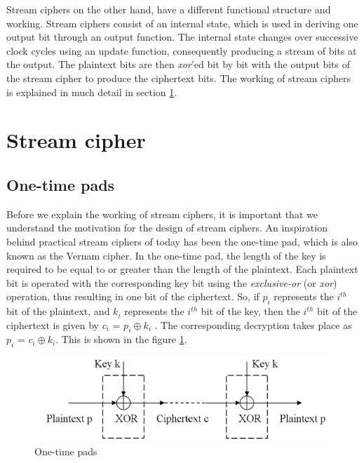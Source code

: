 Stream ciphers on the other hand, have a different functional structure and working. Stream ciphers consist of an internal state, which is used in deriving one output bit through an output function. The internal state changes over successive clock cycles using an update function, consequently producing a stream of bits at the output. The plaintext bits are then \emph{xor}'ed bit by bit with the output bits of the stream cipher to produce the ciphertext bits. The working of stream ciphers is explained in much detail in section \ref{sec:stream-cipher}. 

\section{Stream cipher}
\label{sec:stream-cipher}

\subsection{One-time pads} 
\label{sec:one-time-pads}

Before we explain the working of stream ciphers, it is important that we understand the motivation for the design of stream ciphers. An inspiration behind practical stream ciphers of today has been the one-time pad, which is also known as the Vernam cipher. In the one-time pad, the length of the key is required to be equal to or greater than the length of the plaintext. Each plaintext bit is operated with the corresponding key bit using the \emph{exclusive-or} (or \emph{xor}) operation, thus resulting in one bit of the ciphertext. So, if $p_i$ represents the $i^{th}$ bit of the plaintext, and $k_i$ represents the $i^{th}$ bit of the key, then the $i^{th}$ bit of the ciphertext is given by $c_i$ = $p_i \oplus k_i$ \cite{stamp2007acb}. The corresponding decryption takes place as $p_i$ = $c_i \oplus k_i$. This is shown in the figure \ref{fig:one-time-pad}.

\begin{figure}[ht!]
	\centering
		\includegraphics[width=4.4in]{./figures/one-time-pad.PNG}
	\caption{One-time pads}	
	\label{fig:one-time-pad}
\end{figure}


